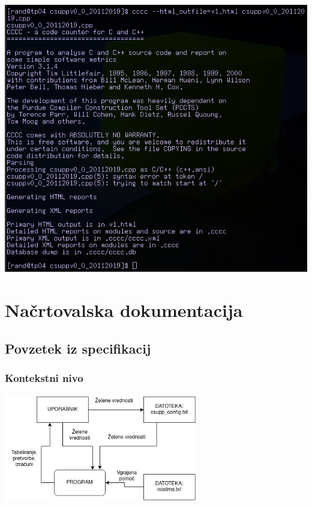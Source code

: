 \documentclass[a4paper,12pt]{article}
\begin{document}
	{

	\centering

	\includegraphics[width=14cm]{diagrami_slike/napaka_cccc.png}

	}



\newpage

	\section{Načrtovalska dokumentacija}

		\subsection{Povzetek iz specifikacij}

			\subsubsection{Kontekstni nivo}

			{

			\centering

			\includegraphics[width=8.5cm]{diagrami_slike/kont_nivo.png}

			}
\end{document}
